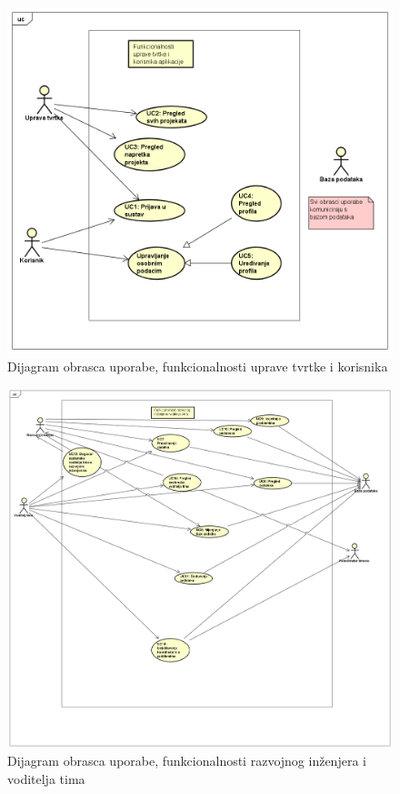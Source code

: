 					\begin{figure} 
						\includegraphics[width=\textwidth]{slike/funkc_korisnika_i_uprave.png}
						\caption{Dijagram obrasca uporabe, funkcionalnosti uprave tvrtke i korisnika}
					\end{figure}
					
					
					\begin{figure} 
						\includegraphics[width=\textwidth]{slike/funkc_razvojnog_inzenjera_i_voditelja.png}
						\caption{Dijagram obrasca uporabe, funkcionalnosti razvojnog inženjera i voditelja tima}
					\end{figure}
					
